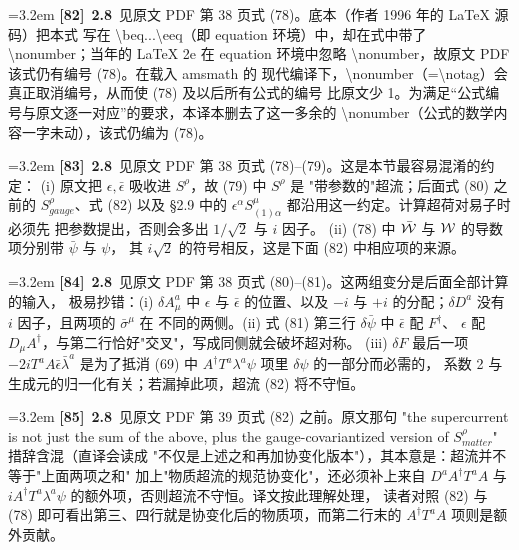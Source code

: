 \par\medskip\noindent\hangindent=3.2em \textbf{[82]}~\textbf{2.8}~见原文 PDF 第 38 页式 (78)。底本（作者 1996 年的 LaTeX 源码）把本式 写在 \textbackslash{}beq...\textbackslash{}eeq（即 equation 环境）中，却在式中带了 \textbackslash{}nonumber；当年的 LaTeX 2e 在 equation 环境中忽略 \textbackslash{}nonumber，故原文 PDF 该式仍有编号 (78)。在载入 amsmath 的 现代编译下，\textbackslash{}nonumber（=\textbackslash{}notag）会真正取消编号，从而使 (78) 及以后所有公式的编号 比原文少 1。为满足“公式编号与原文逐一对应”的要求，本译本删去了这一多余的 \textbackslash{}nonumber（公式的数学内容一字未动），该式仍编为 (78)。
\par
\par\medskip\noindent\hangindent=3.2em \textbf{[83]}~\textbf{2.8}~见原文 PDF 第 38 页式 (78)--(79)。这是本节最容易混淆的约定： (i) 原文把 $\epsilon,\bar\epsilon$ 吸收进 $S^\rho$，故 (79) 中 $S^\rho$ 是 "带参数的"超流；后面式 (80) 之前的 $S^{\rho}_{gauge}$、式 (82) 以及 §2.9 中的 $\epsilon^\alpha S^\mu_{(1)\alpha}$ 都沿用这一约定。计算超荷对易子时必须先 把参数提出，否则会多出 $1/\sqrt2$ 与 $i$ 因子。 (ii) (78) 中 $\bar{\cal W}$ 与 ${\cal W}$ 的导数项分别带 $\bar\psi$ 与 $\psi$， 其 $i\sqrt2$ 的符号相反，这是下面 (82) 中相应项的来源。
\par
\par\medskip\noindent\hangindent=3.2em \textbf{[84]}~\textbf{2.8}~见原文 PDF 第 38 页式 (80)--(81)。这两组变分是后面全部计算的输入， 极易抄错：(i) $\delta A^a_\mu$ 中 $\epsilon$ 与 $\bar\epsilon$ 的位置、以及 $-i$ 与 $+i$ 的分配；$\delta D^a$ 没有 $i$ 因子，且两项的 $\bar\sigma^\mu$ 在 不同的两侧。(ii) 式 (81) 第三行 $\delta\bar\psi$ 中 $\bar\epsilon$ 配 $F^\dagger$、 $\epsilon$ 配 $D_\mu A^\dagger$，与第二行恰好"交叉"，写成同侧就会破坏超对称。 (iii) $\delta F$ 最后一项 $-2iT^aA\bar\epsilon\bar\lambda^a$ 是为了抵消 (69) 中 $A^\dagger T^a\lambda^a\psi$ 项里 $\delta\psi$ 的一部分而必需的， 系数 2 与生成元的归一化有关；若漏掉此项，超流 (82) 将不守恒。
\par
\par\medskip\noindent\hangindent=3.2em \textbf{[85]}~\textbf{2.8}~见原文 PDF 第 39 页式 (82) 之前。原文那句 "the supercurrent is not just the sum of the above, plus the gauge-covariantized version of $S^\rho_{matter}$" 措辞含混（直译会读成 "不仅是上述之和再加协变化版本"），其本意是：超流并不等于"上面两项之和" 加上"物质超流的规范协变化"，还必须补上来自 $D^aA^\dagger T^aA$ 与 $iA^\dagger T^a\lambda^a\psi$ 的额外项，否则超流不守恒。译文按此理解处理， 读者对照 (82) 与 (78) 即可看出第三、四行就是协变化后的物质项，而第二行末的 $A^\dagger T^aA$ 项则是额外贡献。

